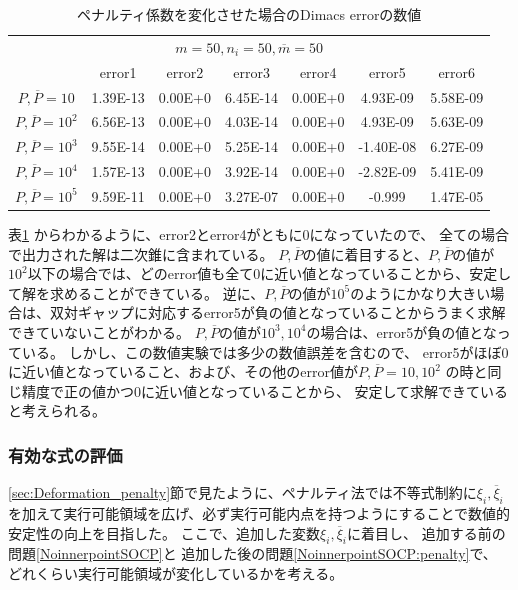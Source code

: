 \documentclass[11pt,a4paper,dvipdfmx,titlepage,uplatex]{jsarticle}
\theoremstyle{mystyle}
\newcommand{\0}{\mathbf{0}}
\begin{document}
\begin{table}[tp]
  \caption{ペナルティ係数を変化させた場合のDimacs errorの数値}
  \label{table:Experimental_Result_penalty_dimacserror}
  \centering
  \scriptsize
  \begin{tabular}{|c|c|c|c|c|c|c|}
    \cline{1-7}
    \multicolumn{7}{|c|}{$m = 50,n_i = 50,\overline{m}= 50$}\\
    \cline{1-7}
    & error1 & error2 & error3 & error4 & error5& error6 \\
    \cline{1-7}
    $P, \overline{P} = 10$ & 1.39E-13 & 0.00E+0 & 6.45E-14 & 0.00E+0 & 4.93E-09 & 5.58E-09 \\
    \cline{1-7}
    $P, \overline{P} = 10^2$ & 6.56E-13 & 0.00E+0 & 4.03E-14 & 0.00E+0 & 4.93E-09 & 5.63E-09 \\
    \cline{1-7}
    $P, \overline{P} = 10^3$  & 9.55E-14 & 0.00E+0 & 5.25E-14 & 0.00E+0 & -1.40E-08 & 6.27E-09 \\
    \cline{1-7}
    $P, \overline{P} = 10^4$  & 1.57E-13 & 0.00E+0 & 3.92E-14 & 0.00E+0 & -2.82E-09 & 5.41E-09 \\
    \cline{1-7}
    $P, \overline{P} = 10^5$  & 9.59E-11 & 0.00E+0 & 3.27E-07 & 0.00E+0 & -0.999 & 1.47E-05 \\
    \cline{1-7}
  \end{tabular}
\end{table}

表\ref{table:Experimental_Result_penalty_dimacserror}
からわかるように、error2とerror4がともに0になっていたので、
全ての場合で出力された解は二次錐に含まれている。
$P, \overline{P}$の値に着目すると、$P, \overline{P}$の値が$10^2$以下の場合では、どのerror値も全て0に近い値となっていることから、安定して解を求めることができている。
逆に、$P, \overline{P}$の値が$10^5$のようにかなり大きい場合は、双対ギャップに対応するerror5が負の値となっていることからうまく求解できていないことがわかる。
$P, \overline{P}$の値が$10^3,10^4$の場合は、error5が負の値となっている。
しかし、この数値実験では多少の数値誤差を含むので、
error5がほぼ0に近い値となっていること、および、その他のerror値が$P, \overline{P} = 10,10^2$
の時と同じ精度で正の値かつ0に近い値となっていることから、
安定して求解できていると考えられる。

\subsubsection{有効な式の評価}
\ref{sec:Deformation_penalty}節で見たように、ペナルティ法では不等式制約に$\xi_i,\overline{\xi}_i$を加えて実行可能領域を広げ、必ず実行可能内点を持つようにすることで数値的安定性の向上を目指した。
ここで、追加した変数$\xi_i,\overline{\xi}_i$に着目し、
追加する前の問題\eqref{NoinnerpointSOCP}と
追加した後の問題\eqref{NoinnerpointSOCP:penalty}で、
どれくらい実行可能領域が変化しているかを考える。
\end{document}
